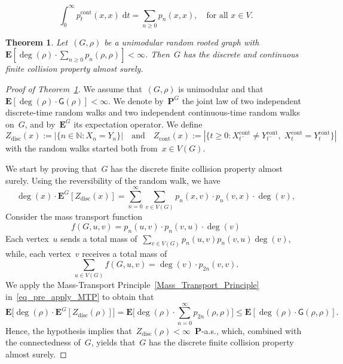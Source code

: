 \documentclass[10pt,a4paper]{amsart}
\newtheorem{theorem}{Theorem}
\newcommand{\NN}{\mathbb{N}}
\begin{document}
\begin{equation}\label{eq_standar_cont_disc}
\int^\infty_0 p^\mathrm{cont}_t(x,x) \; \mathrm{d}t = \sum_{n \ge 0}p_n(x,x), \quad \text{for all } x \in V.
\end{equation}

\begin{theorem}\label{thm_unimodularity_FCP}
Let~$(G,\rho)$ be a unimodular random rooted graph with~$\mathbf E[ \deg(\rho) \cdot \sum_{n \ge 0} p_n(\rho,\rho) ] <  \infty$. Then~$G$ has the discrete and continuous finite collision property almost surely. 
\end{theorem}

\begin{proof}[Proof of Theorem~\ref{thm_unimodularity_FCP}] We assume that~$(G,\rho)$ is unimodular and that~$\mathbf{E} [\deg(\rho) \cdot \mathsf G(\rho)] < \infty$. We denote by~$\mathbf P^G$ the joint law of two independent discrete-time random walks and two independent continuous-time random walks on~$G$, and by~$\mathbf E^G$ its expectation operator. We define
$$ Z_\mathrm{disc}(x) := |\{n \in \NN: X_n = Y_n\}| \quad \text{and} \quad Z_\mathrm{cont}(x) := |\{ t \ge 0: X^\mathrm{cont}_{t^-} \neq Y^\mathrm{cont}_{t^-}, \; X^\mathrm{cont}_t = Y^\mathrm{cont}_t \}| $$
with the random walks started both from~$x \in V(G)$. 

We start by proving that~$G$ has the discrete finite collision property almost surely. Using the reversibility of the random walk, we have 
\begin{equation}\label{eq_pre_apply_MTP}
    \deg(x) \cdot \mathbf E^G [Z_\mathrm{disc}(x)] = \sum^\infty_{n = 0} \sum_{v \in V(G)} p_n(x,v) \cdot p_n(v,x) \cdot \deg(v),
\end{equation}
Consider the mass transport function
$$ f(G,u,v) = p_n(u,v) \cdot p_n(v,u) \cdot \deg(v) $$
Each vertex~$u$ sends a total mass of~$\sum_{v \in V(G)}p_n(u,v) p_n(v,u) \deg(v)$, while, each vertex~$v$ receives a total mass of
$$ \sum_{u \in V(G)} f(G,u,v) = \deg(v) \cdot p_{2n}(v,v). $$
We apply the Mass-Transport Principle~\eqref{Mass_Transport_Principle} in~\eqref{eq_pre_apply_MTP} to obtain that 
$$ \mathbf{E} \big[ \deg(\rho) \cdot \mathbf E^G[Z_\mathrm{disc}(\rho) ] \big] = \mathbf{E} \big[ \deg(\rho) \cdot \sum^\infty_{n = 0} p_{2n}(\rho,\rho) \big] \leq \mathbf E[ \deg(\rho) \cdot \mathsf G(\rho,\rho) ]. $$
Hence, the hypothesis implies that~$Z_\mathrm{disc}(\rho)<\infty$~$\mathbf P$-a.s., which, combined with the connectedness of~$G$, yields that~$G$ has the discrete finite collision property almost surely.


\end{proof}
\end{document}
